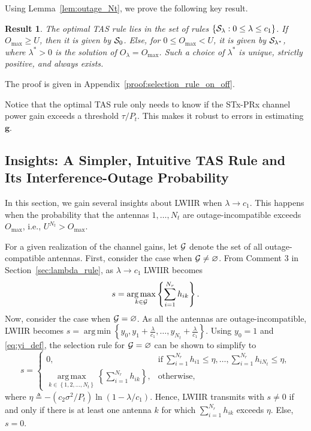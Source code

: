 \documentclass[12pt,draftcls,peerreview,onecolumn]{IEEEtran}
\newtheorem{result}{{\bf Result}}
\newcommand{\brac}[1]{\left({#1}\right)}
\newcommand{\set}[1]{\{#1\}}
\newcommand{\define}{\triangleq}
\newcommand{\tendsto}{\to}
\newcommand{\ie}{{i.e.}}
\newcommand{\prob}[1]{\text{Pr}\brac{#1}}
\DeclareMathOperator*{\argmin}{arg\,min}
\DeclareMathOperator*{\argmax}{arg\,max}
\newcommand{\lam}{\lambda}
\newcommand{\lamstar}{\lam^{*}}
\newcommand{\goodset}{\cal{G}}
\newcommand{\Nt}{{N_t}}
\newcommand{\Nr}{{N_r}}
\newcommand{\Pt}{{P_t}}
\newcommand{\such}{h}
\newcommand{\puch}{g}
\newcommand{\hk}[1]{{\such_{#1}}}
\newcommand{\gk}[1]{{\puch_{#1}}}
\newcommand{\g}{\mathbf{\puch}}
\newcommand{\noisevar}{\sigma^2}
\newcommand{\outmax}{O_{\text{max}}}
\newcommand{\itau}{\tau}
\newcommand{\cone}{c_{1}}
\newcommand{\ctwo}{c_{2}}
\newcommand{\out}{O}
\newcommand{\taubypt}{\frac{\itau}{\Pt}}
\newcommand{\gkgrtaubypt}[1]{{\gk{#1}}>\taubypt}
\newcommand{\lambym}{\frac{\lam}{\cone}}
\newcommand{\yk}[1]{y_{#1}}
\newcommand{\al}{\ctwo}
\newcommand{\un}{U}
\newcommand{\antopts}{\left\{1,2,\ldots,\Nt\right\}}
\newcommand{\igammainline}{{- \left( {\al\noisevar}/{\Pt}\right)  \ln\left({1-\lam/\cone }\right) }}
\newcommand{\caluncons}{{\cal S_{\text{0}}}}
\newcommand{\callamrule}{{\cal S_{{\lam}}}}
\newcommand{\outlam}{\out_{\lam}}
\newcommand{\callamstarrule}{\cal S_{\lam^{*}}}
\newcommand{\nullset}{\varnothing}
\newcommand{\sumnr}{\sum_{i=1}^{\Nr}}
\begin{document}
Using Lemma~\ref{lem:outage_Nt}, we prove the following key result. 
%
\begin{result}
\label{thm:selection_rule_on_off}
The optimal TAS rule lies in the set of rules $\set{\callamrule:0\leq\lam\leq\cone}$. If $\outmax\geq\un$, then it is given by $\caluncons$. Else, for $0\leq\outmax<\un$, it is given by $\callamstarrule$, where $\lamstar>0$  is the solution of $\outlam=\outmax$. Such a choice of $\lamstar$ is unique, strictly positive, and always exists. 
\end{result}
%                
\begin{IEEEproof}
   The proof is given in Appendix~\ref{proof:selection_rule_on_off}.
\end{IEEEproof}
%

Notice that the optimal TAS rule only needs to know if the STx-PRx channel power gain exceeds a threshold $\tau/\Pt$. This makes it robust to errors in estimating $\g$. 

\subsection{Insights: A Simpler, Intuitive  TAS Rule and Its Interference-Outage Probability}
In this section, we gain several insights about LWIIR when $\lam \tendsto \cone$. This happens when the probability that the antennas $1,\ldots,\Nt$ are outage-incompatible exceeds $\outmax$, \ie, $\un^{\Nt}>\outmax$.    %
%

\newcommand{\gammath}{\eta}
For a given realization of the channel gains, let $\goodset$ denote the set of all outage-compatible antennas. First, consider the case when $\goodset\neq\nullset$. From Comment 3 in Section~\ref{sec:lambda_rule},  as $\lam \tendsto \cone$ LWIIR becomes 
\begin{equation}
\label{eq:hp_rule_G_not_empty}
s = \argmax_{k\in\goodset}\left\lbrace \sumnr \hk{ik}\right\rbrace. 
\end{equation}
Now, consider the case when $\goodset= \nullset$. As all the antennas are outage-incompatible, LWIIR becomes $s = \argmin\left\lbrace  \yk{0},\yk{1}+\lambym,\ldots,\yk{\Nt}+\lambym \right\rbrace$. Using $\yk{0}=1$ and \eqref{eq:yi_def}, the selection rule for $\goodset = \nullset$ can be shown to simplify to 
\begin{equation}
\label{eq:hp_rule_G_empty}
s = \left\{
\begin{array}{ll}
0 , & \text{if}~\sumnr\hk{i1}\leq\gammath,\ldots, \sumnr\hk{i\Nt}\leq\gammath, \\
\argmax\limits_{k\in\antopts}\left\lbrace \sumnr\hk{ik}\right\rbrace , &\text{otherwise},
\end{array}\right.
\end{equation}
where $\gammath\define\igammainline$. Hence, LWIIR transmits with $s\neq0$ if and only if there is at least one antenna $k$ for which $\sumnr \hk{ik}$ exceeds $\gammath$. Else, $s=0$. 
\end{document}
